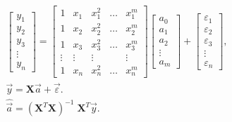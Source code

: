 \begin{enumerate}
    \begin{eqnarray}
        \label{eq:poly-solve}
        \displaystyle {\begin{bmatrix}y_{1}\\y_{2}\\y_{3}\\\vdots \\y_{n}\end{bmatrix}}={\begin{bmatrix}1&x_{1}&x_{1}^{2}&\dots &x_{1}^{m}\\1&x_{2}&x_{2}^{2}&\dots &x_{2}^{m}\\1&x_{3}&x_{3}^{2}&\dots &x_{3}^{m}\\\vdots &\vdots &\vdots &&\vdots \\1&x_{n}&x_{n}^{2}&\dots &x_{n}^{m}\end{bmatrix}}{\begin{bmatrix}a_{0}\\a_{1}\\a_{2}\\\vdots \\a_{m}\end{bmatrix}}+{\begin{bmatrix}\varepsilon _{1}\\\varepsilon _{2}\\\varepsilon _{3}\\\vdots \\\varepsilon _{n}\end{bmatrix}}, \\
        \vec y = \mathbf{X} \vec a + \vec\varepsilon. \\
        \widehat{\vec a} = (\mathbf{X}^T \mathbf{X})^{-1}\; \mathbf{X}^T \vec y.
    \end{eqnarray}
   
    
   

\end{enumerate}
